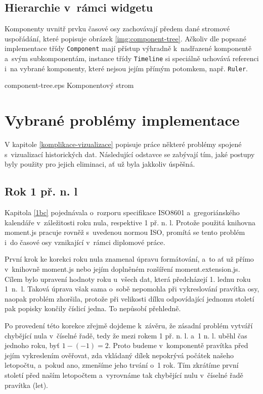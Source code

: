 			\subsection{Hierarchie v~rámci widgetu}
				Komponenty uvnitř prvku časové osy zachovávají předem dané stromové uspořá\-dání, které popisuje obrázek \ref{img:component-tree}. Ačkoliv dle popsané implementace třídy {\tt Compo\-nent} mají přístup výhradně k~nadřazené komponentě a~svým subkomponentám, instance třídy {\tt Timeline} si speciálně uchovává referenci i~na vybrané komponenty, které nejsou jejím přímým potomkem, např. {\tt Ruler}.
			
				{}{component-tree.eps}
				{Komponentový strom}{}
			
		\section{Vybrané problémy implementace}
			V kapitole \ref{komplikace-vizualizace} popisuje práce některé problémy spojené s~vizualizací historických dat. Následující odstavce se zabývají tím, jaké postupy byly použity pro jejich eliminaci, ať už byla jakkoliv úspěšná.
		
			\subsection{Rok 1 př. n. l}
				Kapitola \ref{1bc} pojednávala o~rozporu specifikace ISO8601 a~gregoriánského kalendáře v~záležitosti roku nula, respektive 1 př. n. l. Protože použitá knihovna {\sf moment.js} pracuje rovněž s~uvedenou normou ISO, promítá se tento problém i~do časové osy vznikající v~rámci diplomové práce.
				
				První krok ke korekci roku nula znamenal úpravu formátování, a~to ať už přímo v~knihovně {\sf moment.js} nebo jejím doplněném rozšíření {\sf moment.extension.js}. Cílem bylo upravení hodnoty roku u~všech dat, která předcházejí 1. lednu roku 1~n.~l. Taková úprava však sama o~sobě nepomohla při vykreslování pravítka osy, naopak problém zhoršila, protože při velikosti dílku odpovídající jednomu století pak popisky končily číslicí jedna. To nepůsobí přehledně.
				
				Po provedení této korekce zřejmě dojdeme k~závěru, že zásadní problém vytváří chybějící nula v~číselné řadě, tedy že mezi rokem 1 př. n. l. a~1 n. l. uběhl čas jednoho roku, byť $1 - (-1) = 2$. Proto budeme v~komponentě pravítka před jejím vykreslením ověřovat, zda vkládaný dílek nepokrývá počátek našeho letopočtu, a~pokud ano, zmenšíme jeho trvání o~1 rok. Tím zkrátíme první století před naším letopočtem a~vyrovnáme tak chybějící nulu v~číselné řadě pravítka (let).
				
